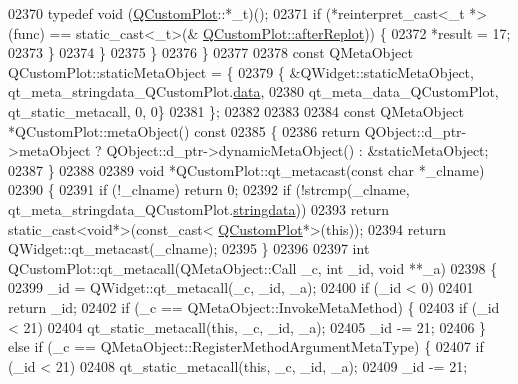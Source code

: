 \begin{DoxyCode}
02370             \textcolor{keyword}{typedef} void (\hyperlink{a00030_d8/d00/a00186}{QCustomPlot}::*\_t)();
02371             \textcolor{keywordflow}{if} (*reinterpret\_cast<\_t *>(func) == \textcolor{keyword}{static\_cast<}\_t\textcolor{keyword}{>}(&
      \hyperlink{a00116_a6f4fa624af060bc5919c5f266cf426a0}{QCustomPlot::afterReplot})) \{
02372                 *result = 17;
02373             \}
02374         \}
02375     \}
02376 \}
02377 
02378 \textcolor{keyword}{const} QMetaObject QCustomPlot::staticMetaObject = \{
02379     \{ &QWidget::staticMetaObject, qt\_meta\_stringdata\_QCustomPlot.\hyperlink{a00067_a294e0b700c66ea0a3f528f255fa52fff}{data},
02380       qt\_meta\_data\_QCustomPlot,  qt\_static\_metacall, 0, 0\}
02381 \};
02382 
02383 
02384 \textcolor{keyword}{const} QMetaObject *QCustomPlot::metaObject()\textcolor{keyword}{ const}
02385 \textcolor{keyword}{}\{
02386     \textcolor{keywordflow}{return} QObject::d\_ptr->metaObject ? QObject::d\_ptr->dynamicMetaObject() : &staticMetaObject;
02387 \}
02388 
02389 \textcolor{keywordtype}{void} *QCustomPlot::qt\_metacast(\textcolor{keyword}{const} \textcolor{keywordtype}{char} *\_clname)
02390 \{
02391     \textcolor{keywordflow}{if} (!\_clname) \textcolor{keywordflow}{return} 0;
02392     \textcolor{keywordflow}{if} (!strcmp(\_clname, qt\_meta\_stringdata\_QCustomPlot.\hyperlink{a00067_a06c7bf819765fdc7a40739cfb2bb681c}{stringdata}))
02393         \textcolor{keywordflow}{return} \textcolor{keyword}{static\_cast<}\textcolor{keywordtype}{void}*\textcolor{keyword}{>}(\textcolor{keyword}{const\_cast<} \hyperlink{a00030_d8/d00/a00186}{QCustomPlot}*\textcolor{keyword}{>}(\textcolor{keyword}{this}));
02394     \textcolor{keywordflow}{return} QWidget::qt\_metacast(\_clname);
02395 \}
02396 
02397 \textcolor{keywordtype}{int} QCustomPlot::qt\_metacall(QMetaObject::Call \_c, \textcolor{keywordtype}{int} \_id, \textcolor{keywordtype}{void} **\_a)
02398 \{
02399     \_id = QWidget::qt\_metacall(\_c, \_id, \_a);
02400     \textcolor{keywordflow}{if} (\_id < 0)
02401         \textcolor{keywordflow}{return} \_id;
02402     \textcolor{keywordflow}{if} (\_c == QMetaObject::InvokeMetaMethod) \{
02403         \textcolor{keywordflow}{if} (\_id < 21)
02404             qt\_static\_metacall(\textcolor{keyword}{this}, \_c, \_id, \_a);
02405         \_id -= 21;
02406     \} \textcolor{keywordflow}{else} \textcolor{keywordflow}{if} (\_c == QMetaObject::RegisterMethodArgumentMetaType) \{
02407         \textcolor{keywordflow}{if} (\_id < 21)
02408             qt\_static\_metacall(\textcolor{keyword}{this}, \_c, \_id, \_a);
02409         \_id -= 21;

\end{DoxyCode}
